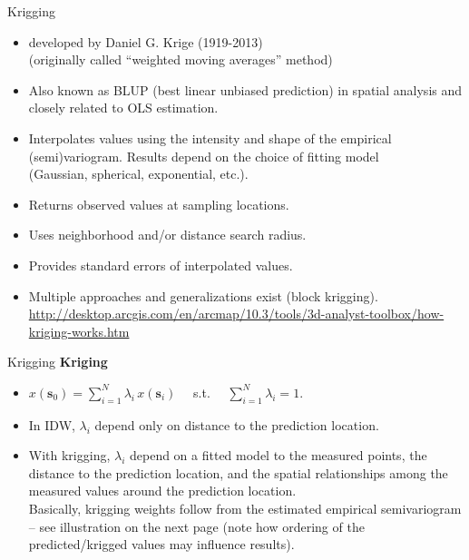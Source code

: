 \documentclass{beamer}
\begin{document}
\begin{frame}{Krigging}
\begin{itemize}
    \item developed by Daniel G. Krige (1919-2013) \\(originally called ``weighted moving averages'' method) 
    \smallskip
    \item Also known as BLUP (best linear unbiased prediction) in spatial analysis and closely related to OLS estimation.
    \smallskip
    \item Interpolates values using the intensity and shape of the empirical (semi)variogram. Results depend on the choice of fitting model \\(Gaussian, spherical, exponential, etc.).
    \smallskip
    \item Returns observed values at sampling locations.
    \smallskip
    \item Uses neighborhood and/or distance search radius.
    \smallskip
    \item Provides standard errors of interpolated values.
    \smallskip
    \item Multiple approaches and generalizations exist (block krigging). \\
    \url{http://desktop.arcgis.com/en/arcmap/10.3/tools/3d-analyst-toolbox/how-kriging-works.htm}
\end{itemize}
\end{frame}
\begin{frame}{Krigging}
\textbf{Kriging}\\ \medskip
\begin{itemize}
    \item $x(\bm{s}_0)= \sum_{i=1}^N \lambda_i \, x(\bm{s}_i)$ ~~s.t.~~ $\sum_{i=1}^N \lambda_i = 1$. 
    \bigskip
    \item In IDW, $\lambda_i$ depend only on distance to the prediction location.\\
    \bigskip
    \item  With krigging, $\lambda_i$ depend on a fitted model to the measured points, the distance to the prediction location, and the spatial relationships among the measured values around the prediction location. \\ \medskip Basically, krigging weights follow from the estimated empirical semivariogram -- see illustration on the next page (note how ordering of the predicted/krigged values may influence results).
\end{itemize}
\end{frame}
\end{document}
